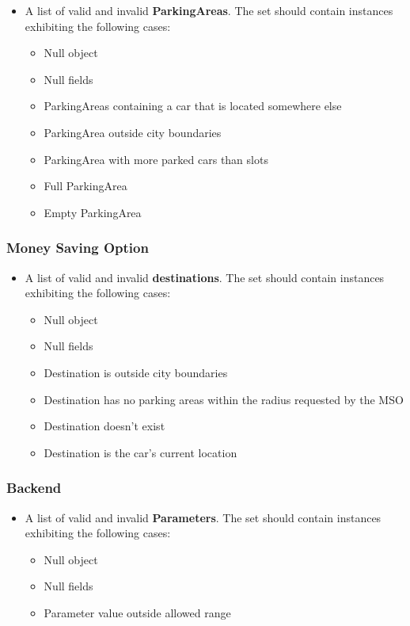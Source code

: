 		\begin{itemize}
			\item A list of valid and invalid \textbf{ParkingAreas}. The set should contain instances exhibiting the following cases:
				\begin{itemize}
					\item Null object
					\item Null fields
					\item ParkingAreas containing a car that is located somewhere else
					\item ParkingArea outside city boundaries
					\item ParkingArea with more parked cars than slots
					\item Full ParkingArea
					\item Empty ParkingArea
				\end{itemize}
		\end{itemize}
		
		
		
		\subsubsection{Money Saving Option}
		
		\begin{itemize}
			\item A list of valid and invalid \textbf{destinations}. The set should contain instances exhibiting the following cases:
				\begin{itemize}
					\item Null object
					\item Null fields
					\item Destination is outside city boundaries
					\item Destination has no parking areas within the radius requested by the MSO
					\item Destination doesn't exist
					\item Destination is the car's current location
				\end{itemize}
		\end{itemize}
		
		
		
		\subsubsection{Backend}
		
		\begin{itemize}
			\item A list of valid and invalid \textbf{Parameters}. The set should contain instances exhibiting the following cases:
				\begin{itemize}
					\item Null object
					\item Null fields
					\item Parameter value outside allowed range
				\end{itemize}
		\end{itemize}
		
